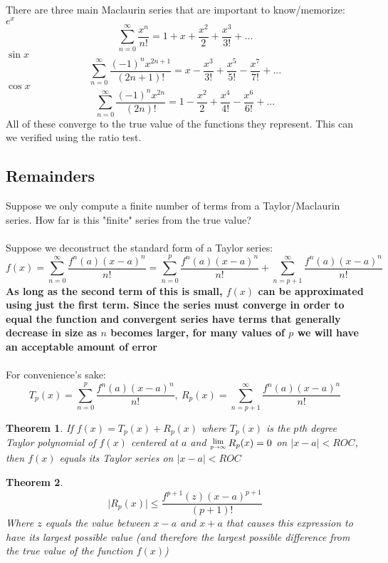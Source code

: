 \documentclass[12 pt]{article}
\newcommand{\Lim}[1]{\raisebox{0.5ex}{\scalebox{0.8}{$\displaystyle \lim_{#1}\;$}}}
\newcommand{\sumz}{\sum\limits_{n=0}^{\infty}}
\newcommand{\toinfty}{\rightarrow\infty}
\newtheorem*{thrm}{Theorem}
\begin{document}
		There are three main Maclaurin series that are important to know/memorize:\\
		\textbf{$e^x$}
		$$\sumz \frac{x^n}{n!}=1+x+\frac{x^2}{2}+\frac{x^3}{3!}+...$$
		\textbf{$\sin{x}$}
		$$\sumz \frac{(-1)^nx^{2n+1}}{(2n+1)!}=x-\frac{x^3}{3!}+\frac{x^5}{5!}-\frac{x^7}{7!}+...$$
		\textbf{$\cos{x}$}
		$$\sumz \frac{(-1)^nx^{2n}}{(2n)!}=1-\frac{x^2}{2}+\frac{x^4}{4!}-\frac{x^6}{6!}+...$$
		All of these converge to the true value of the functions they represent. This can we verified using the ratio test.

		\subsection{Remainders}

		Suppose we only compute a finite number of terms from a Taylor/Maclaurin series. How far is this "finite" series from the true value?\\\\
		Suppose we deconstruct the standard form of a Taylor series:
		$$f(x)=\sumz \frac{f^n(a)(x-a)^n}{n!}=\sum_{n=0}^p \frac{f^n(a)(x-a)^n}{n!}+\sum_{n=p+1}^{\infty} \frac{f^n(a)(x-a)^n}{n!}$$
		\textbf{As long as the second term of this is small, $f(x)$ can be approximated using just the first term. Since the series must converge in order to equal the function and convergent series have terms that generally decrease in size as $n$ becomes larger, for many values of $p$ we will have an acceptable amount of error}\\\\

		For convenience's sake:
		$$T_p(x)=\sum_{n=0}^p \frac{f^n(a)(x-a)^n}{n!},\ R_p(x)=\sum_{n=p+1}^{\infty} \frac{f^n(a)(x-a)^n}{n!}$$

		\begin{thrm} If $f(x)=T_p(x)+R_p(x)$ where $T_p(x)$ is the $p$th degree Taylor polynomial of $f(x)$ centered at $a$ and $\Lim{p\toinfty} R_p(x)=0$ on $\lvert x-a\rvert<ROC$, then $f(x)$ equals its Taylor series on $\lvert x-a\rvert<ROC$
		\end{thrm}

		\begin{thrm}$$\lvert R_p(x)\rvert\leq \frac{f^{p+1}(z)(x-a)^{p+1}}{(p+1)!}$$
			Where $z$ equals the value between $x-a$ and $x+a$ that causes this expression to have its largest possible value (and therefore the largest possible difference from the true value of the function $f(x)$)
		\end{thrm}
\end{document}
